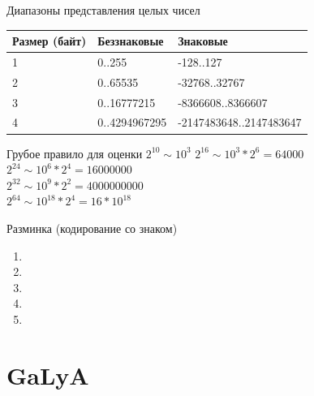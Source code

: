 \documentclass{beamer}
\begin{document}
    \begin{frame}{Диапазоны представления целых чисел}
        \begin{table}
            \begin{tabular}{|l|l|l|}
            \hline Размер (байт) & Беззнаковые & Знаковые \\
            \hline   1           &  0..255     & -128..127 \\
            \hline   2           &  0..65535   & -32768..32767 \\
            \hline   3           &  0..16777215 & -8366608..8366607 \\
            \hline   4           &  0..4294967295 & -2147483648..2147483647 \\
            \hline
            \end{tabular}    
        \end{table}
        \begin{block}{Грубое правило для оценки $ 2^{10} \sim 10^3$}
            $2^{16} \sim 10^3 * 2^6 = 64000$ \\
            $2^{24} \sim 10^6 * 2^4 = 16000000$ \\
            $2^{32} \sim 10^9 * 2^2 = 4000000000$ \\
            $2^{64} \sim 10^{18} * 2^4 = 16 *10^{18}$
        \end{block}
    \end{frame}
    \begin{frame}{Разминка (кодирование со знаком)}
        \begin{enumerate}
            \item {}
            \item<2-> 
            \item<3-> 
            \item<4-> 
            \item<5-> 
        \end{enumerate} 
    \end{frame}
    \section{GaLyA}
\end{document}
